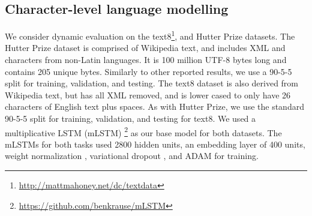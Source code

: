\documentclass{article}
\begin{document}
\subsection{Character-level language modelling}
\label{sec:char}
We consider dynamic evaluation on the text8\footnote{\url{http://mattmahoney.net/dc/textdata}}, and Hutter Prize \citep{Hutter-2006} datasets. The Hutter Prize dataset is comprised of Wikipedia text, and includes XML and characters from non-Latin languages. It is 100 million UTF-8 bytes long and contains 205 unique bytes. Similarly to other reported results, we use a 90-5-5 split for training, validation, and testing. The text8 dataset is also derived from Wikipedia text, but has all XML removed, and is lower cased to only have 26 characters of English text plus spaces. As with Hutter Prize, we use the standard 90-5-5 split for training, validation, and testing for text8. We used a multiplicative LSTM (mLSTM) \citep{krause2016}\footnote{\url{https://github.com/benkrause/mLSTM}} as our base model for both datasets. The mLSTMs for both tasks used 2800 hidden units, an embedding layer of 400 units, weight normalization \citep{salimans2016}, variational dropout \citep{gal2016}, and ADAM \citep{kingma2014} for training. 
\end{document}
